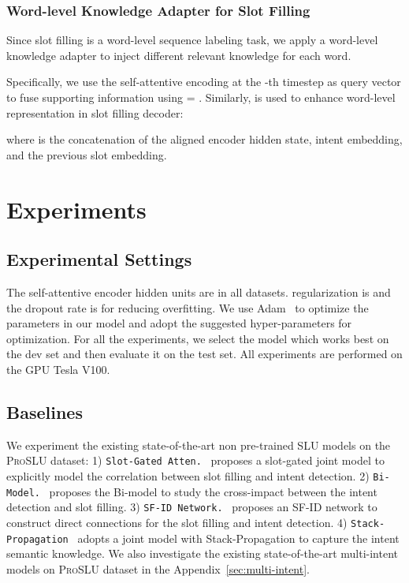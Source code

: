 \documentclass[letterpaper]{article} \usepackage{aaai22}  \usepackage{times}  \usepackage{helvet}  \usepackage{courier}  \usepackage[hyphens]{url}  \usepackage{graphicx} \urlstyle{rm} \def\UrlFont{\rm}  \usepackage{natbib}  \usepackage{caption} \DeclareCaptionStyle{ruled}{labelfont=normalfont,labelsep=colon,strut=off} \frenchspacing  \setlength{\pdfpagewidth}{8.5in}  \setlength{\pdfpageheight}{11in}  \usepackage{algorithm}
\begin{document}
\subsubsection{Word-level Knowledge Adapter for Slot Filling}
Since slot filling is a word-level sequence labeling task, we apply a word-level knowledge adapter to inject different relevant knowledge for each word.

Specifically, we use the self-attentive encoding  at the -th timestep as query vector to fuse supporting information using  =  .
Similarly,  is used to enhance word-level representation in slot filling decoder:

where  is the concatenation of the aligned encoder hidden state, intent embedding, and the previous slot embedding.  \section{Experiments}
\label{experiments}
\subsection{Experimental Settings}
The self-attentive encoder hidden units are  in all datasets.  regularization is  and the dropout rate is  for reducing overfitting. We use Adam~\citep{kingma2014adam} to optimize the parameters in our model and adopt the suggested hyper-parameters for optimization. For all the experiments, we select the model which works best on the dev set and then evaluate it on the test set. All experiments are performed on the GPU Tesla V100. 

\subsection{Baselines}
We experiment the existing state-of-the-art non pre-trained SLU models on the \textsc{ProSLU} dataset: 
1) {\texttt{Slot-Gated Atten.}}~\citet{goo-etal-2018-slot} proposes a slot-gated joint model to explicitly model the correlation between slot filling and intent detection. 
2) {\texttt{Bi-Model.}}~\citet{wang-etal-2018-bi} proposes the Bi-model to study the cross-impact between the intent detection and slot filling. 
3) {\texttt{SF-ID Network.}}~\citet{e-etal-2019-novel} proposes an SF-ID network to construct direct connections for the slot filling and intent detection. 
4) {\texttt{Stack-Propagation}}~\citet{qin-etal-2019-stack} adopts a joint model with Stack-Propagation to capture the intent semantic knowledge.
We also investigate the existing state-of-the-art multi-intent models on \textsc{ProSLU} dataset in the Appendix~\ref{sec:multi-intent}.
\end{document}
